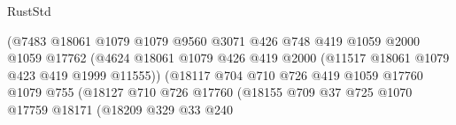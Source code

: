 \begin{lexlean}{RustStd}
\begin{coremodule}
{\begin{coremodule}
{{{{{{{{{{{{{{{{{{{{{{{{{{{{{{{{{{{                                                (@7483
                                                  @18061
                                                  @1079
                                                  @1079
                                                  @9560
                                                  @3071
                                                  @426
                                                  @748
                                                  @419
                                                  @1059
                                                  @2000
                                                  @1059
                                                  @17762
                                                  (@4624
                                                    @18061
                                                    @1079
                                                    @426
                                                    @419
                                                    @2000
                                                    (@11517 @18061 @1079 @423 @419 @1999 @11555))
                                                  (@18117
                                                    @704
                                                    @710
                                                    @726
                                                    @419
                                                    @1059
                                                    @17760
                                                    @1079
                                                    @755
                                                    (@18127
                                                      @710
                                                      @726
                                                      @17760
                                                      (@18155
                                                        @709
                                                        @37
                                                        @725
                                                        @1070
                                                        @17759
                                                        @18171
                                                        (@18209
                                                          @329
                                                          @33
                                                          @240
}}}}}}}}}}}}}}}}}}}}}}}}}}}}}}}}}}}
\end{coremodule}}
\end{coremodule}
\end{lexlean}

